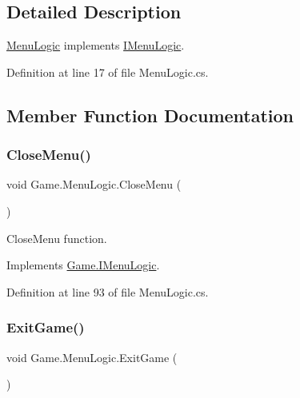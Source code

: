 \subsection{Detailed Description}
\mbox{\hyperlink{class_game_1_1_menu_logic}{Menu\+Logic}} implements \mbox{\hyperlink{interface_game_1_1_i_menu_logic}{I\+Menu\+Logic}}. 



Definition at line 17 of file Menu\+Logic.\+cs.



\subsection{Member Function Documentation}
\mbox{\label{class_game_1_1_menu_logic_adeb1e1749499593128d22ff14e9c3507}} 
\subsubsection{\texorpdfstring{CloseMenu()}{CloseMenu()}}
{\footnotesize\ttfamily void Game.\+Menu\+Logic.\+Close\+Menu (\begin{DoxyParamCaption}{ }\end{DoxyParamCaption})}



Close\+Menu function. 



Implements \mbox{\hyperlink{interface_game_1_1_i_menu_logic_aab0f7fd346ea32f819ec12aee99d3656}{Game.\+I\+Menu\+Logic}}.



Definition at line 93 of file Menu\+Logic.\+cs.

\mbox{\label{class_game_1_1_menu_logic_a615398aa76c650db2fa6a3f5fcf7e215}} 
\subsubsection{\texorpdfstring{ExitGame()}{ExitGame()}}
{\footnotesize\ttfamily void Game.\+Menu\+Logic.\+Exit\+Game (\begin{DoxyParamCaption}{ }\end{DoxyParamCaption})}



